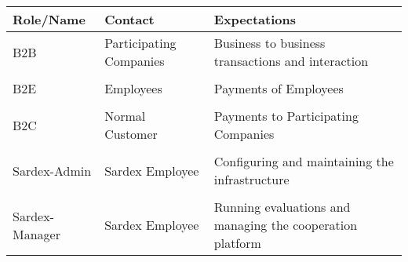 \begin{longtable}[]{@{}lll@{}}
\toprule
\begin{minipage}[b]{0.18\columnwidth}\raggedright\strut
Role/Name\strut
\end{minipage} & \begin{minipage}[b]{0.37\columnwidth}\raggedright\strut
Contact\strut
\end{minipage} & \begin{minipage}[b]{0.37\columnwidth}\raggedright\strut
Expectations\strut
\end{minipage}\tabularnewline
\midrule
\endhead
\begin{minipage}[t]{0.18\columnwidth}B2B \end{minipage} &
\begin{minipage}[t]{0.37\columnwidth}Participating Companies \end{minipage} &
\begin{minipage}[t]{0.37\columnwidth}Business to business transactions and interaction\end{minipage}
\tabularnewline
\tabularnewline
\begin{minipage}[t]{0.18\columnwidth}B2E \end{minipage} &
\begin{minipage}[t]{0.37\columnwidth}Employees \end{minipage} &
\begin{minipage}[t]{0.37\columnwidth}Payments of Employees\end{minipage}
\tabularnewline
\tabularnewline
\begin{minipage}[t]{0.18\columnwidth}B2C \end{minipage} &
\begin{minipage}[t]{0.37\columnwidth}Normal Customer \end{minipage} &
\begin{minipage}[t]{0.37\columnwidth}Payments to Participating Companies\end{minipage}
\tabularnewline
\tabularnewline
\begin{minipage}[t]{0.18\columnwidth}Sardex-Admin \end{minipage} &
\begin{minipage}[t]{0.37\columnwidth}Sardex Employee \end{minipage} &
\begin{minipage}[t]{0.37\columnwidth}Configuring and maintaining the infrastructure\end{minipage}
\tabularnewline
\tabularnewline
\begin{minipage}[t]{0.18\columnwidth}Sardex-Manager \end{minipage} &
\begin{minipage}[t]{0.37\columnwidth}Sardex Employee \end{minipage} &
\begin{minipage}[t]{0.37\columnwidth}Running evaluations and managing the cooperation platform \end{minipage}
\tabularnewline


\bottomrule
\end{longtable}

